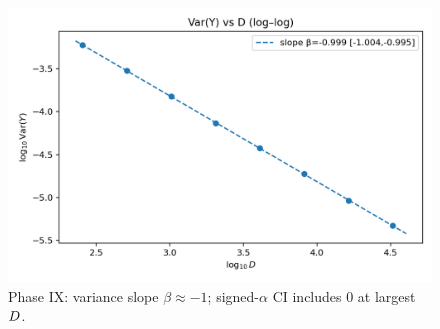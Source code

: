 \documentclass[11pt]{article}
\begin{document}
\begin{figure}[h]
\centering
\includegraphics[width=0.75\linewidth]{phase9_varY_scaling.png}
\caption{Phase IX: variance slope $\beta \approx -1$; signed-$\alpha$ CI includes 0 at largest $D$.}
\end{figure}

\clearpage




\end{document}
